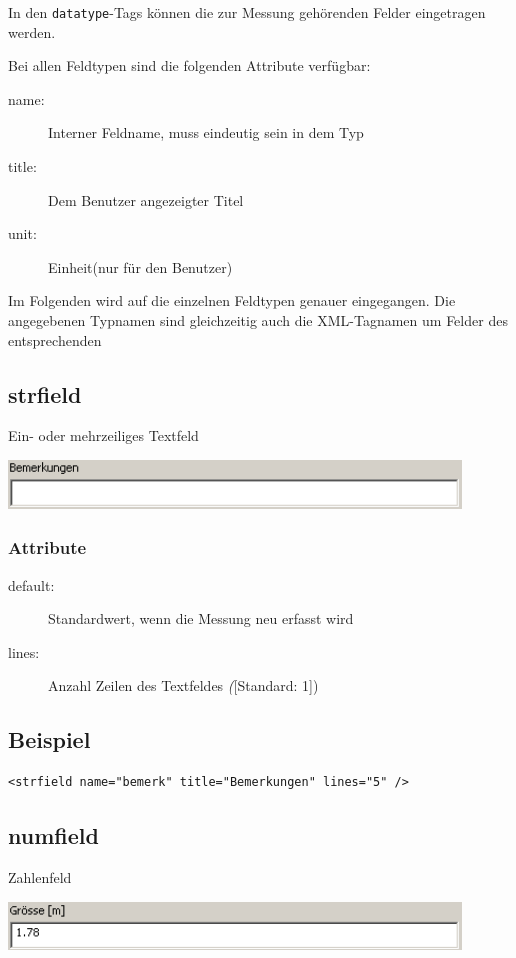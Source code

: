 \documentclass[a4paper]{scrartcl}
\begin{document}
In den \texttt{datatype}-Tags können die zur Messung gehörenden Felder
eingetragen werden.

Bei allen Feldtypen sind die folgenden Attribute verfügbar:
\begin{description}
    \item[name:] Interner Feldname, muss eindeutig sein in dem Typ
    \item[title:] Dem Benutzer angezeigter Titel
    \item[unit:] Einheit(nur für den Benutzer)
\end{description}

Im Folgenden wird auf die einzelnen Feldtypen genauer eingegangen. Die
angegebenen Typnamen sind gleichzeitig auch die XML-Tagnamen um Felder des
entsprechenden


\subsection{strfield}
Ein- oder mehrzeiliges Textfeld
\begin{center}
    \includegraphics[width=12cm]{images/strfield.png}
\end{center}
\subsubsection{Attribute}
\begin{description}
    \item [default:] Standardwert, wenn die Messung neu erfasst wird
    \item [lines:] Anzahl Zeilen des Textfeldes \textit([Standard: 1])
\end{description}
\subsection{Beispiel}
\begin{lstlisting}
<strfield name="bemerk" title="Bemerkungen" lines="5" />
\end{lstlisting}


\subsection{numfield}
Zahlenfeld
\begin{center}
    \includegraphics[width=12cm]{images/numfield.png}
\end{center}
\end{document}
